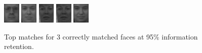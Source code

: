 \begin{figure}[hbt]
  \includegraphics[width=0.07\textwidth]{../results/H_rez/correct95/3/6.jpg}
  \includegraphics[width=0.07\textwidth]{../results/H_rez/correct95/3/7.jpg}
  \includegraphics[width=0.07\textwidth]{../results/H_rez/correct95/3/8.jpg}
  \includegraphics[width=0.07\textwidth]{../results/H_rez/correct95/3/8.jpg}
  \includegraphics[width=0.07\textwidth]{../results/H_rez/correct95/3/10.jpg}
  \caption{Top matches for 3 correctly matched faces at 95\% information retention.}
  \label{fig:correct95}
\end{figure}

~\vfill


